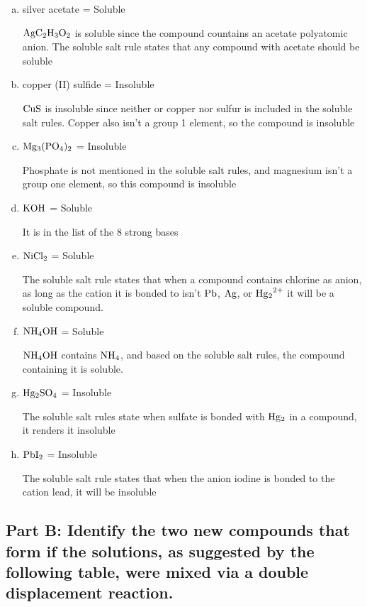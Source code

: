 \documentclass{scrartcl}
\begin{document}
\begin{enumerate}[a.]
\item silver acetate = Soluble

\(\ce{AgC2H3O2}\) is soluble since the compound
countains an acetate  polyatomic anion. The soluble salt rule states that any
compound with acetate should be soluble

\item copper (II) sulfide = Insoluble

\(\ce{CuS}\) is insoluble since neither or
copper nor sulfur is included in the soluble salt rules. Copper also isn't a
group 1 element, so the compound is insoluble

\item \(\ce{Mg3(PO4)2}\) = Insoluble

Phosphate is not mentioned in the soluble
salt rules, and magnesium isn't a group one element, so this compound is
insoluble

\item \(\ce{KOH}\) = Soluble

It is in the list of the 8 strong bases

\item \(\ce{NiCl2}\) = Soluble

The soluble salt rule states that when a compound
contains chlorine as anion, as long as the cation it is bonded to isn't
\(\ce{Pb}\),     \(\ce{Ag}\), or \(\ce{Hg2^{2+}}\) it will be a soluble
compound.

\item \(\ce{NH4OH}\) = Soluble

\(\ce{NH4OH}\) contains \(\ce{NH4}\), and based on
the soluble salt rules, the compound containing it is soluble.

\item \(\ce{Hg2SO4}\) = Insoluble

The soluble salt rules state when sulfate is
bonded with     \(\ce{Hg2}\) in a compound, it renders it insoluble

\item \(\ce{PbI2}\) = Insoluble

The soluble salt rule states that when the anion
iodine is bonded to the cation lead, it will be insoluble
\end{enumerate}

\subsection{Part B: Identify the two new compounds that form if the solutions, as suggested by the following table, were mixed via a double displacement reaction.}
\label{sec:org1ac85cb}
\end{document}

